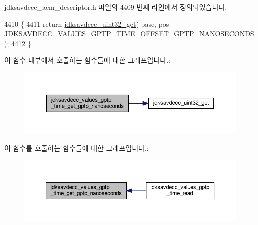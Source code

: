 jdksavdecc\+\_\+aem\+\_\+descriptor.\+h 파일의 4409 번째 라인에서 정의되었습니다.


\begin{DoxyCode}
4410 \{
4411     \textcolor{keywordflow}{return} \hyperlink{group__endian_gaefcf5bd4f368997a82f358ab89052d6b}{jdksavdecc\_uint32\_get}( base, pos + 
      \hyperlink{group__values__gptp__time_ga0ff7c38cf1d92833d016826d0e36c6f7}{JDKSAVDECC\_VALUES\_GPTP\_TIME\_OFFSET\_GPTP\_NANOSECONDS} );
4412 \}
\end{DoxyCode}


이 함수 내부에서 호출하는 함수들에 대한 그래프입니다.\+:
\nopagebreak
\begin{figure}[H]
\begin{center}
\leavevmode
\includegraphics[width=350pt]{group__values__gptp__time_ga125442481fda8ef931f1e6ae5b787839_cgraph}
\end{center}
\end{figure}




이 함수를 호출하는 함수들에 대한 그래프입니다.\+:
\nopagebreak
\begin{figure}[H]
\begin{center}
\leavevmode
\includegraphics[width=350pt]{group__values__gptp__time_ga125442481fda8ef931f1e6ae5b787839_icgraph}
\end{center}
\end{figure}


